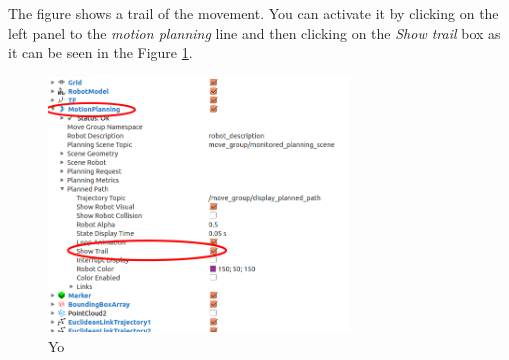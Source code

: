 The figure shows a trail of the movement. You can activate it by clicking on the left panel to the \emph{motion planning} line and then clicking on the \emph{Show trail} box as it can be seen in the Figure \ref{fig:show_trail}.  


\begin{figure}
\includegraphics[width=8cm]{images/installation_first/show_trail.png}
\centering
\caption{Yo}
\label{fig:show_trail}
\end{figure}